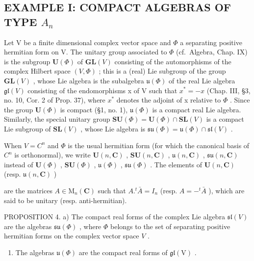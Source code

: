 \subsection{\texorpdfstring{EXAMPLE I: COMPACT ALGEBRAS OF TYPE \(A_{n}\)}{EXAMPLE I: COMPACT ALGEBRAS OF TYPE A\_\{n\}}}

Let V be a finite dimensional complex vector space and \(\Phi\) a separating positive hermitian form on V. The unitary group associated to \(\Phi\) (cf.~Algebra, Chap. IX) is the subgroup \(\mathbf{U}(\Phi)\) of \(\mathbf{GL}(V)\) consisting of the automorphisms of the complex Hilbert space \((V,\Phi)\) ; this is a (real) Lie subgroup of the group \(\mathbf{GL}(V)\) , whose Lie algebra is the subalgebra \(\mathfrak{u}(\Phi)\) of the real Lie algebra \(\mathfrak{gl}(V)\) consisting of the endomorphisms x of V such that \(x^{*} = -x\) (Chap. III, §3, no. 10, Cor. 2 of Prop. 37), where \(x^{*}\) denotes the adjoint of x relative to \(\Phi\) . Since the group \(\mathbf{U}(\Phi)\) is compact (§1, no. 1), \(\mathfrak{u}(\Phi)\) is a compact real Lie algebra. Similarly, the special unitary group \(\mathbf{SU}(\Phi) = \mathbf{U}(\Phi) \cap \mathbf{SL}(V)\) is a compact Lie subgroup of \(\mathbf{SL}(V)\) , whose Lie algebra is \(\mathfrak{su}(\Phi) = \mathfrak{u}(\Phi) \cap \mathfrak{sl}(V)\) .

When \(V = C^{n}\) and \(\varPhi\) is the usual hermitian form (for which the canonical basis of \(C^{n}\) is orthonormal), we write \(\mathbf{U}(n, \mathbf{C})\) , \(\mathbf{SU}(n, \mathbf{C})\) , \(\mathfrak{u}(n, \mathbf{C})\) , \(\mathfrak{s}\mathfrak{u}(n, \mathbf{C})\) instead of \(\mathbf{U}(\varPhi)\) , \(\mathbf{SU}(\varPhi)\) , \(\mathfrak{u}(\varPhi)\) , \(\mathfrak{s}\mathfrak{u}(\varPhi)\) . The elements of \(\mathbf{U}(n, \mathbf{C})\) (resp. \(\mathfrak{u}(n, \mathbf{C})\) )

are the matrices \(A \in \mathrm{M}_{n}(\mathbf{C})\) such that \(A.^{t}\bar{A} = I_{n}\) (resp. \(A = -^{t}\bar{A}\) ), which are said to be unitary (resp. anti-hermitian).

PROPOSITION 4. a) The compact real forms of the complex Lie algebra \(\mathfrak{sl}(V)\) are the algebras \(\mathfrak{su}(\Phi)\) , where \(\Phi\) belongs to the set of separating positive hermitian forms on the complex vector space \(V\) .

\begin{enumerate}
\def\labelenumi{\alph{enumi})}
\setcounter{enumi}{1}
\tightlist
\item
  The algebras \(\mathfrak{u}(\varPhi)\) are the compact real forms of \(\mathfrak{gl}(\mathrm{V})\) .
\end{enumerate}

